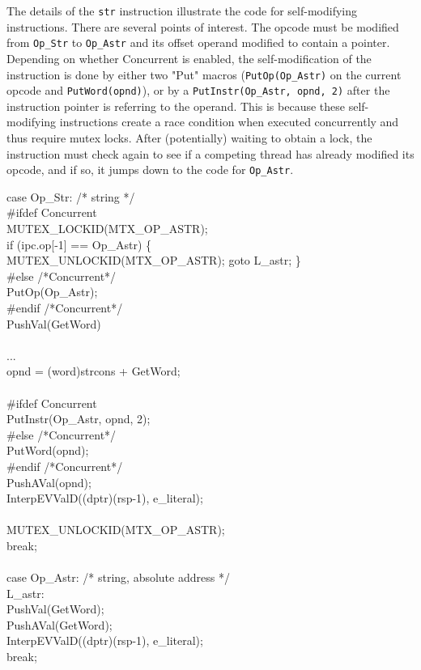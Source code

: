 The details of the \texttt{str} instruction illustrate the code for
self-modifying instructions. There are several points of interest. The
opcode must be modified from \texttt{Op\_Str} to \texttt{Op\_Astr} and
its offset operand modified to contain a pointer.  Depending on
whether Concurrent is enabled, the self-modification of the
instruction is done by either two "Put" macros
(\texttt{PutOp(Op\_Astr)} on the current opcode and
\texttt{PutWord(opnd)}), or by a \texttt{PutInstr(Op\_Astr, opnd, 2)}
after the instruction pointer is referring to the operand.  This is
because these self-modifying instructions create a race condition when
executed concurrently and thus require mutex locks.  After
(potentially) waiting to obtain a lock, the instruction must check
again to see if a competing thread has already modified its opcode,
and if so, it jumps down to the code for \texttt{Op\_Astr}.


\begin{iconcode}
\>\>\>	 case Op\_Str:		/* string */ \\
\#ifdef Concurrent \\
\>\>\>\>    MUTEX\_LOCKID(MTX\_OP\_ASTR); \\
\>\>\>\>    if (ipc.op[-1] == Op\_Astr) \{ \\
\>\>\>\>\>     MUTEX\_UNLOCKID(MTX\_OP\_ASTR); goto L\_astr; \} \\
\#else					/*Concurrent*/ \\
\>\>\>\>    PutOp(Op\_Astr); \\
\#endif					/*Concurrent*/ \\
\>\>\>\>    PushVal(GetWord) \\
\ \\
\>\>\>\>	... \\
\>\>\>\>       opnd = (word)strcons + GetWord; \\
\ \\
\#ifdef Concurrent \\
\>\>\>\>    PutInstr(Op\_Astr, opnd, 2); \\
\#else					/*Concurrent*/ \\
\>\>\>\>    PutWord(opnd); \\
\#endif					/*Concurrent*/ \\
\>\>\>\>    PushAVal(opnd); \\
\>\>\>\>    InterpEVValD((dptr)(rsp-1), e\_literal); \\
\ \\
\>\>\>\>    MUTEX\_UNLOCKID(MTX\_OP\_ASTR); \\
\>\>\>\>    break; \\
\ \\
\>\>\>	 case Op\_Astr:		/* string, absolute address */ \\
L\_astr: \\
\>\>\>\>    PushVal(GetWord); \\
\>\>\>\>    PushAVal(GetWord); \\
\>\>\>\>    InterpEVValD((dptr)(rsp-1), e\_literal); \\
\>\>\>\>    break;
\end{iconcode}

